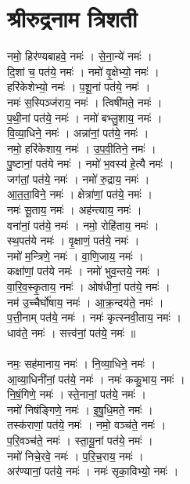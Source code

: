 \section{श्रीरुद्रनाम त्रिशती}
नमो॒ हिर॑ण्यबाहवे॒ नमः॑ । से॒ना॒न्ये॑  नमः॑ ।\\
दि॒शां च॒ पत॑ये॒ नमः॑ । नमो॑ वृ॒क्षेभ्यो॒ नमः॑ ।\\
हरि॑केशेभ्यो॒  नमः॑ । प॒शू॒नां पत॑ये॒  नमः॑ ।\\
नमः॑ स॒स्पिञ्ज॑राय॒ नमः॑ । त्विषी॑मते॒ नमः॑ ।\\
प॒थी॒नां पत॑ये॒ नमः॑ । नमो॑ बभ्लु॒शाय॒ नमः॑ ।\\
वि॒व्या॒धिने॒ नमः॑ । अन्ना॑नां॒ पत॑ये॒ नमः॑ ।\\
नमो॒ हरि॑केशाय॒ नमः॑ । उ॒प॒वी॒तिने॒ नमः॑ ।\\
पु॒ष्टानां॒ पत॑ये नमः॑ । नमो॑ भ॒वस्य॑ हे॒त्यै नमः॑ ।\\
जग॑तां॒ पत॑ये॒ नमः॑ । नमो॑ रु॒द्राय॒ नमः॑ ।\\
आ॒त॒ता॒विने॒ नमः॑ । क्षेत्रा॑णां॒ पत॑ये॒ नमः॑ ।\\
नमः॑ सू॒ताय॒ नमः॑ । अह॑न्त्याय॒ नमः॑ ।\\
वना॑नां॒  पत॑ये॒ नमः॑ । नमो॒ रोहि॑ताय॒ नमः॑ ।\\
स्थ॒पत॑ये नमः॑ । वृ॒क्षाणं॒ पत॑ये॒ नमः॑ ।\\
नमो॑ म॒न्त्रिणे॒ नमः॑ । वा॒णि॒जाय॒ नमः॑ ।\\
कक्षा॑णां॒ पत॑ये नमः॑ । नमो॑ भुव॒न्तये॒ नमः॑ ।\\
वा॒रि॒व॒स्कृ॒ताय॒ नमः॑ । ओष॑धीनां॒ पत॑ये॒ नमः॑ ।\\
नम॑ उ॒च्चैर्घो॑षाय॒ नमः॑ । आ॒क्र॒न्दय॑ते॒ नमः॑ ।\\
प॒त्ती॒नाम् पत॑ये॒ नमः॑ । नमः॑ कृत्स्नवी॒ताय॒ नमः॑ ।\\
धाव॑ते॒ नमः॑ । सत्त्व॑नां॒ पत॑ये॒ नमः॑ ॥\\
\\
नमः॒ सह॑मानाय॒ नमः॑ । नि॒व्या॒धिने॒ नमः॑ ।\\
आ॒व्या॒धिनी॑नां॒ पत॑ये॒ नमः॑ । नमः॑ ककु॒भाय॒ नमः॑ ।\\
नि॒षं॒गिणे॒ नमः॑ । स्ते॒नानां॒ पत॑ये॒ नमः॑ ।\\
नमो॑ निषंङ्गिणे॒ नमः॑ । इ॒षु॒धि॒मते॒ नमः॑ ।\\
तस्क॑राणां॒ पत॑ये॒ नमः॑ । नमो॒ वञ्च॑ते॒ नमः॑ ।\\
प॒रि॒वञ्च॑ते॒ नमः॑ । स्ता॒यू॒नां पत॑ये॒ नमः॑ ।\\
नमो॑ निचे॒रवे॒ नमः॑ । प॒रि॒च॒राय॒ नमः॑ ।\\
अर॑ण्यानां॒ पत॑ये॒ नमः॑ । नमः॑ सृका॒विभ्यो॒ नमः॑ ।\\
